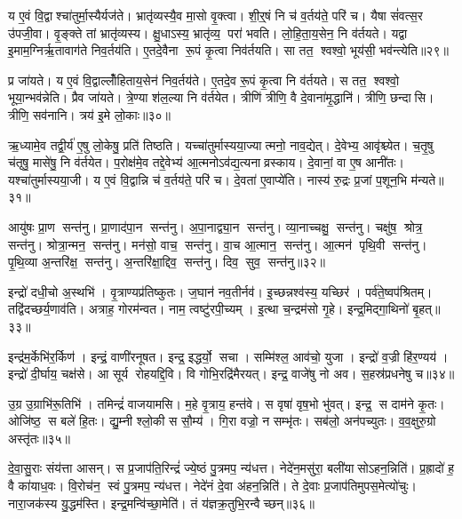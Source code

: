 य ए॒वं वि॒द्वाश्चा॑तुर्मा॒स्यैर्यज॑ते।
भ्रातृ॑व्यस्यै॒व मा॒सो वृ॒क्त्वा।
शी॒र्॒षं नि च॑ व॒र्तय॑ते॒ परि॑ च।
यैषा सं॑वत्स॒र उ॑पजी॒वा।
वृ॒ङ्क्ते तां भ्रातृ॑व्यस्य।
क्षु॒धाऽस्य॒ भ्रातृ॑व्य॒ परा॑ भवति।
लो॒हि॒ता॒य॒सेन॒ नि व॑र्तयते।
यद्वा इ॒माम॒ग्निर्\mbox{}ऋ॒तावाग॑ते निव॒र्तय॑ति।
ए॒तदे॒वैना रू॒पं कृ॒त्वा निव॑र्तयति।
सा तत॒ श्वश्वो॒ भूय॑सी॒ भव॑न्त्येति॥२९॥

प्र जा॑यते।
य ए॒वं वि॒द्वाल्लोँ॑हिताय॒सेन॑ निव॒र्तय॑ते।
ए॒तदे॒व रू॒पं कृ॒त्वा नि व॑र्तयते।
स तत॒ श्वश्वो॒ भूया॒न्भव॑न्नेति।
प्रैव जा॑यते।
त्रे॒ण्या श॑ल॒ल्या नि व॑र्तयेत।
त्रीणि॑ त्रीणि॒ वै दे॒वाना॑मृ॒द्धानि॑।
त्रीणि॒ छन्दासि।
त्रीणि॒ सव॑नानि।
त्रय॑ इ॒मे लो॒काः॥३०॥

ऋ॒ध्यामे॒व तद्वी॒र्य॑ ए॒षु लो॒केषु॒ प्रति॑ तिष्ठति।
यच्चा॑तुर्मास्यया॒ज्यात्मनो॒ नाव॒द्येत्।
दे॒वेभ्य॒ आवृ॑श्च्येत।
च॒तृ॒षु च॑तृषु॒ मासे॑षु॒ नि व॑र्तयेत।
प॒रोक्ष॑मे॒व तद्दे॒वेभ्य॑ आ॒त्मनोऽव॑द्य॒त्यनाव्रस्काय।
दे॒वानां॒ वा ए॒ष आनी॑तः।
यश्चा॑तुर्मास्यया॒जी।
य ए॒वं वि॒द्वान्नि च॑ व॒र्तय॑ते॒ परि॑ च।
दे॒वता॑ ए॒वाप्ये॑ति।
नास्य॑ रु॒द्रः प्र॒जां प॒शून॒भि म॑न्यते॥३१॥\anuvakamend[ए॒त्ये॒त्य॒यु॒ञ्ज॒तासु॑रा एति लो॒का म॑न्यते]

आयु॑षः प्रा॒ण सन्त॑नु।
प्रा॒णाद॑पा॒न सन्त॑नु।
अ॒पा॒नाद्व्या॒न सन्त॑नु।
व्या॒नाच्चक्षु॒ सन्त॑नु।
चक्षु॑ष॒ श्रोत्र॒ सन्त॑नु।
श्रोत्रा॒न्मन॒ सन्त॑नु।
मन॑सो॒ वाच॒ सन्त॑नु।
वा॒च आ॒त्मान॒ सन्त॑नु।
आ॒त्मन॑ पृथि॒वी सन्त॑नु।
पृ॒थि॒व्या अ॒न्तरि॑क्ष॒ सन्त॑नु।
अ॒न्तरि॑क्षा॒द्दिव॒ सन्त॑नु।
दिव॒ सुव॒ सन्त॑नु॥३२॥\anuvakamend[अ॒न्तरि॑क्ष॒ सन्त॑नु॒ द्वे च॑]

इन्द्रो॑ दधी॒चो अ॒स्थभि॑।
वृ॒त्राण्यप्र॑तिष्कुतः।
ज॒घान॑ नव॒तीर्नव॑।
इ॒च्छन्नश्व॑स्य॒ यच्छिर॑।
पर्व॑ते॒ष्वप॑श्रितम्।
तद्वि॑दच्छर्य॒णाव॑ति।
अत्राह॒ गोरम॑न्वत।
नाम॒ त्वष्टु॑रपी॒च्यम्।
इ॒त्था च॒न्द्रम॑सो गृ॒हे।
इन्द्र॒मिद्गा॒थिनो॑ बृ॒हत्॥३३॥

इन्द्र॑म॒र्केभि॑र॒र्किण॑।
इन्द्रं॒ वाणी॑रनूषत।
इन्द्र॒ इद्धर्यो॒ सचा।
सम्मि॑श्ल॒ आव॑चो॒ युजा।
इन्द्रो॑ व॒ज्री हि॑र॒ण्यय॑।
इन्द्रो॑ दी॒र्घाय॒ चक्ष॑से।
आ सूर्य रोहयद्दि॒वि।
वि गोभि॒रद्रि॑मैरयत्।
इन्द्र॒ वाजे॑षु नो अव।
स॒हस्र॑प्रधनेषु च॥३४॥

उ॒ग्र उ॒ग्राभि॑रू॒तिभि॑।
तमिन्द्रं॑ वाजयामसि।
म॒हे वृ॒त्राय॒ हन्त॑वे।
स वृषा॑ वृष॒भो भु॑वत्।
इन्द्र॒ स दाम॑ने कृ॒तः।
ओजि॑ष्ठ॒ स बले॑ हि॒तः।
द्यु॒म्नी श्लो॒की स सौ॒म्य॑।
गि॒रा वज्रो॒ न सम्भृ॑तः।
सब॑लो॒ अन॑पच्युतः।
व॒व॒क्षुरु॒ग्रो अस्तृ॑तः॥३५॥\anuvakamend[बृ॒हच्चास्तृ॑तः]

दे॒वा॒सु॒राः संय॑त्ता आसन्।
स प्र॒जाप॑ति॒रिन्द्रं॑ ज्ये॒ष्ठं पु॒त्रमप॒ न्य॑धत्त।
नेदे॑न॒मसु॑रा॒ बली॑यासोऽहन॒न्निति॑।
प्र॒ह्रादो॑ ह॒ वै का॑याध॒वः।
वि॒रोच॑न॒ स्वं पु॒त्रमप॒ न्य॑धत्त।
नेदे॑नं दे॒वा अ॑हन॒न्निति॑।
ते दे॒वाः प्र॒जाप॑तिमुपस॒मेत्यो॑चुः।
नारा॒जक॑स्य यु॒द्धम॑स्ति।
इन्द्र॒मन्वि॑च्छा॒मेति॑।
तं य॑ज्ञक्र॒तुभि॒रन्वैच्छन्॥३६॥

